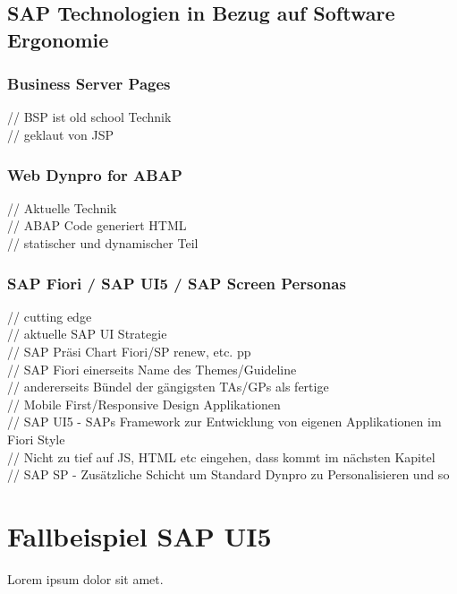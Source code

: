 \documentclass[12pt,a4paper,bibliography=totocnumbered,listof=totocnumbered]{scrartcl}
\begin{document}
\subsection{SAP Technologien in Bezug auf Software Ergonomie}
\subsubsection{Business Server Pages}
// \ac{BSP} ist old school Technik\\
// geklaut von \ac{JSP}\\

\subsubsection{Web Dynpro for ABAP}
// Aktuelle Technik\\
// ABAP Code generiert HTML\\
// statischer und dynamischer Teil\\

\subsubsection{SAP Fiori / SAP UI5 / SAP Screen Personas}
// cutting edge\\
// aktuelle SAP UI Strategie\\
// SAP Präsi Chart Fiori/SP renew, etc. pp\\
// SAP Fiori einerseits Name des Themes/Guideline\\
// andererseits Bündel der gängigsten TAs/GPs als fertige\\
// Mobile First/Responsive Design Applikationen\\
// SAP UI5 - SAPs Framework zur Entwicklung von eigenen Applikationen im Fiori Style\\
// Nicht zu tief auf JS, HTML etc eingehen, dass kommt im nächsten Kapitel\\
// SAP SP - Zusätzliche Schicht um Standard Dynpro zu Personalisieren und so\\
\pagebreak

\section{Fallbeispiel SAP UI5}
Lorem ipsum dolor sit amet.
\end{document}
